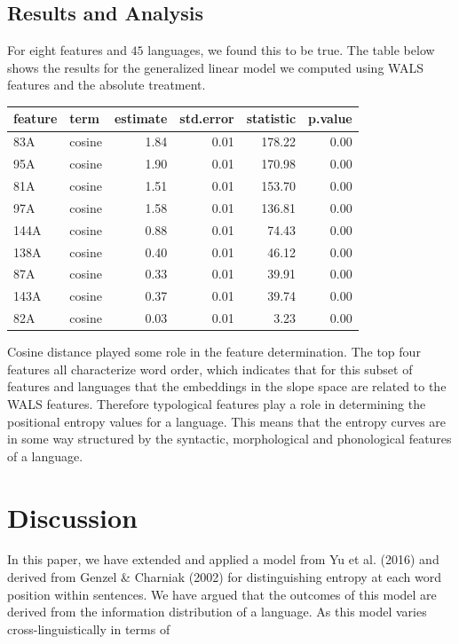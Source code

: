 \documentclass[10pt, letterpaper]{article}
\begin{document}
\subsection{Results and Analysis}\label{results-and-analysis-2}

For eight features and \(45\) languages, we found this to be true. The
table below shows the results for the generalized linear model we
computed using WALS features and the absolute treatment.

\begin{table}[tb]
\centering
\begin{tabular}{llrrrr}
  \hline
feature & term & estimate & std.error & statistic & p.value \\ 
  \hline
83A & cosine & 1.84 & 0.01 & 178.22 & 0.00 \\ 
  95A & cosine & 1.90 & 0.01 & 170.98 & 0.00 \\ 
  81A & cosine & 1.51 & 0.01 & 153.70 & 0.00 \\ 
  97A & cosine & 1.58 & 0.01 & 136.81 & 0.00 \\ 
  144A & cosine & 0.88 & 0.01 & 74.43 & 0.00 \\ 
  138A & cosine & 0.40 & 0.01 & 46.12 & 0.00 \\ 
  87A & cosine & 0.33 & 0.01 & 39.91 & 0.00 \\ 
  143A & cosine & 0.37 & 0.01 & 39.74 & 0.00 \\ 
  82A & cosine & 0.03 & 0.01 & 3.23 & 0.00 \\ 
   \hline
\end{tabular}
\end{table}

Cosine distance played some role in the feature determination. The top
four features all characterize word order, which indicates that for this
subset of features and languages that the embeddings in the slope space
are related to the WALS features. Therefore typological features play a
role in determining the positional entropy values for a language. This
means that the entropy curves are in some way structured by the
syntactic, morphological and phonological features of a language.

\section{Discussion}\label{discussion}

In this paper, we have extended and applied a model from Yu et al.
(2016) and derived from Genzel \& Charniak (2002) for distinguishing
entropy at each word position within sentences. We have argued that the
outcomes of this model are derived from the information distribution of
a language. As this model varies cross-linguistically in terms of
\end{document}
